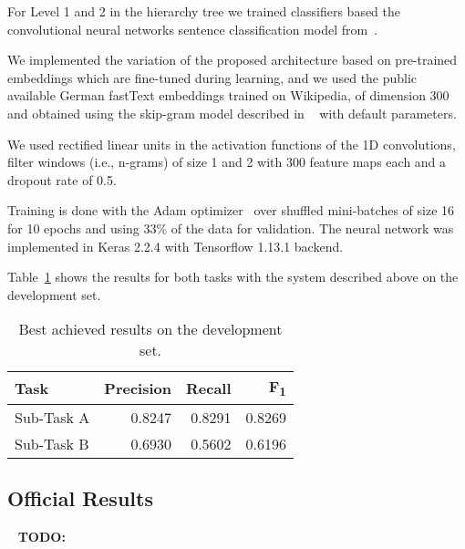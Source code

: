 \documentclass[11pt,a4paper]{article}
\begin{document}
For Level 1 and 2 in the hierarchy tree we trained classifiers based the convolutional
neural networks sentence classification model from~\citet{kim-2014-convolutional}.

We implemented the variation of the proposed architecture based on pre-trained embeddings
which are fine-tuned during learning, and we used the public available German fastText embeddings trained on Wikipedia, of dimension 300 and obtained using the skip-gram model described in ~\citet{bojanowski-etal-2017-enriching} with default parameters.

We used rectified linear units in the activation functions of the 1D convolutions,
filter windows (i.e., n-grams) of size 1 and 2 with 300 feature maps each and a
dropout rate of 0.5.

Training is done with the Adam optimizer~\cite{journals/corr/KingmaB14} over
shuffled mini-batches of size 16 for 10 epochs and using 33\% of the data for validation.
The neural network was implemented in Keras 2.2.4 with Tensorflow 1.13.1 backend.

Table~\ref{devset-results} shows the results for both tasks with the system described
above on the development set.

\begin{table}
\begin{center}
\begin{tabular}{|l|r|r|r|}
\hline\centering\textbf{Task}  & \textbf{Precision} &  \textbf{Recall} &  \textbf{F\textsubscript{1}}\\
\hline
 Sub-Task A   & 0.8247 & 0.8291 & 0.8269 \\
 Sub-Task B   & 0.6930 & 0.5602 & 0.6196 \\
\hline
\end{tabular}
\end{center}
\caption{\label{devset-results} Best achieved results on the development set.}
\end{table}









\subsection{Official Results}

\ \newline
\textbf{TODO:}
\ \newline
\end{document}
